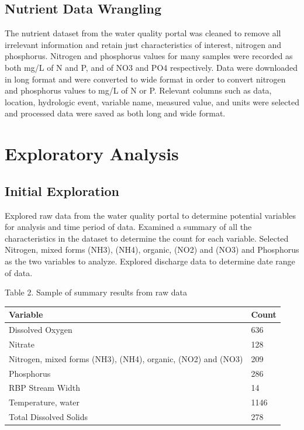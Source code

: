 \documentclass[12pt,]{article}
\begin{document}
\hypertarget{nutrient-data-wrangling}{%
\subsection{Nutrient Data Wrangling}\label{nutrient-data-wrangling}}

The nutrient dataset from the water quality portal was cleaned to remove
all irrelevant information and retain just characteristics of interest,
nitrogen and phosphorus. Nitrogen and phosphorus values for many samples
were recorded as both mg/L of N and P, and of NO3 and PO4 respectively.
Data were downloaded in long format and were converted to wide format in
order to convert nitrogen and phosphorus values to mg/L of N or P.
Relevant columns such as data, location, hydrologic event, variable
name, measured value, and units were selected and processed data were
saved as both long and wide format.

\newpage

\hypertarget{exploratory-analysis}{%
\section{Exploratory Analysis}\label{exploratory-analysis}}

\hypertarget{initial-exploration}{%
\subsection{Initial Exploration}\label{initial-exploration}}

Explored raw data from the water quality portal to determine potential
variables for analysis and time period of data. Examined a summary of
all the characteristics in the dataset to determine the count for each
variable. Selected Nitrogen, mixed forms (NH3), (NH4), organic, (NO2)
and (NO3) and Phosphorus as the two variables to analyze. Explored
discharge data to determine date range of data.

Table 2. Sample of summary results from raw data

\begin{longtable}[]{@{}ll@{}}
\toprule
Variable & Count\tabularnewline
\midrule
\endhead
Dissolved Oxygen & 636\tabularnewline
Nitrate & 128\tabularnewline
Nitrogen, mixed forms (NH3), (NH4), organic, (NO2) and (NO3) &
209\tabularnewline
Phosphorus & 286\tabularnewline
RBP Stream Width & 14\tabularnewline
Temperature, water & 1146\tabularnewline
Total Dissolved Solids & 278\tabularnewline
\bottomrule
\end{longtable}
\end{document}
